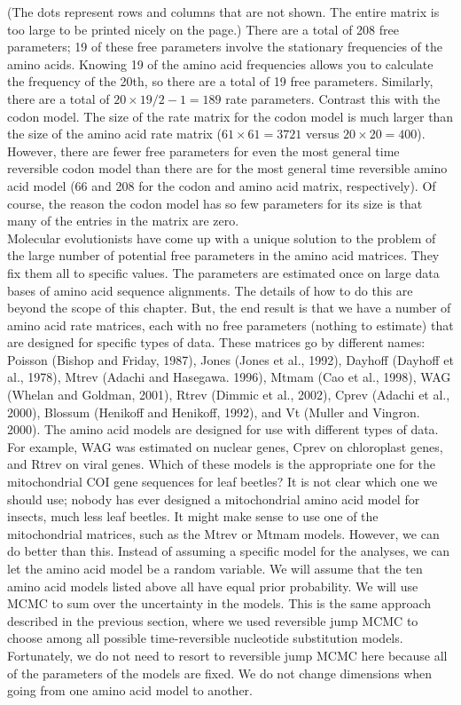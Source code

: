 \documentclass{svmult}
\begin{document}
\begin{description}
(The dots represent rows and columns that are not shown. The entire matrix is too large to be
printed nicely on the page.) There are a total of 208 free parameters; 19 of these free parameters
involve the stationary frequencies of the amino acids. Knowing 19 of the amino acid frequencies
allows you to calculate the frequency of the 20th, so there are a total of 19 free parameters.
Similarly, there are a total of $20 \times 19 / 2 - 1 = 189$ rate parameters.  Contrast this with
the codon model. The size of the rate matrix for the codon model is much larger than the size of
the amino acid rate matrix ($61 \times 61 = 3721$ versus $20 \times 20 = 400$). However, there are
fewer free parameters for even the most general time reversible codon model than there are for the
most general time reversible amino acid model (66 and 208 for the codon and amino acid matrix,
respectively). Of course, the reason the codon model has so few parameters for its size is that
many of the entries in the matrix are zero.\\

Molecular evolutionists have come up with a unique solution to the problem of the large number of
potential free parameters in the amino acid matrices. They fix them all to specific values. The
parameters are estimated once on large data bases of amino acid sequence alignments. The details of
how to do this are beyond the scope of this chapter. But, the end result is that we have a number
of amino acid rate matrices, each with no free parameters (nothing to estimate) that are designed
for specific types of data. These matrices go by different names: Poisson (Bishop and Friday,
1987), Jones (Jones et al., 1992), Dayhoff (Dayhoff et al., 1978), Mtrev (Adachi and Hasegawa.
1996), Mtmam (Cao et al., 1998), WAG (Whelan and Goldman, 2001), Rtrev (Dimmic et al., 2002), Cprev
(Adachi et al., 2000), Blossum (Henikoff and Henikoff, 1992), and Vt (Muller and Vingron. 2000).
The amino acid models are designed for use with different types of data. For example, WAG was
estimated on nuclear genes, Cprev on chloroplast genes, and Rtrev on viral genes. Which of these
models is the appropriate one for the mitochondrial COI gene sequences for leaf beetles? It is not
clear which one we should use; nobody has ever designed a mitochondrial amino acid model for
insects, much less leaf beetles. It might make sense to use one of the mitochondrial matrices, such
as the Mtrev or Mtmam models.  However, we can do better than this. Instead of assuming a specific
model for the analyses, we can let the amino acid model be a random variable. We will assume that
the ten amino acid models listed above all have equal prior probability. We will use MCMC to sum
over the uncertainty in the models.  This is the same approach described in the previous section,
where we used reversible jump MCMC to choose among all possible time-reversible nucleotide
substitution models. Fortunately, we do not need to resort to reversible jump MCMC here because all
of the parameters of the models are fixed.  We do not change dimensions when going from one amino
acid model to another.
\end{description}
\end{document}
